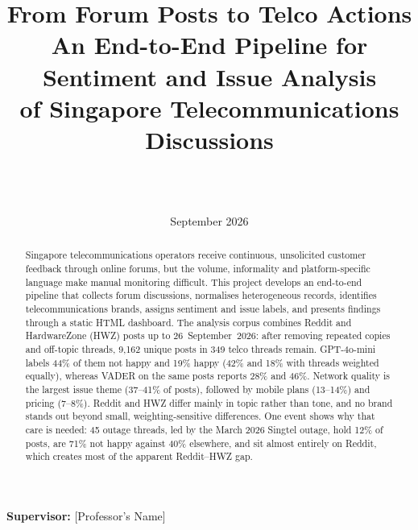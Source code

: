 \documentclass[11pt,a4paper]{article}
\title{\textbf{From Forum Posts to Telco Actions}\\
\large An End-to-End Pipeline for Sentiment and Issue Analysis\\
of Singapore Telecommunications Discussions}
\author{\studentname\\\studentid\\\programme}
\date{September 2026}
\newcommand{\supervisorname}{[Professor's Name]}
\begin{document}
\begin{center}
\end{center}

\maketitle

\begin{center}
\textbf{Supervisor:} \supervisorname
\end{center}

\vfill

\begin{abstract}
Singapore telecommunications operators receive continuous, unsolicited customer feedback through online forums, but the volume, informality and platform-specific language make manual monitoring difficult. This project develops an end-to-end pipeline that collects forum discussions, normalises heterogeneous records, identifies telecommunications brands, assigns sentiment and issue labels, and presents findings through a static HTML dashboard. The analysis corpus combines Reddit and HardwareZone (HWZ) posts up to 26~September~2026: after removing repeated copies and off-topic threads, 9,162 unique posts in 349 telco threads remain. GPT-4o-mini labels 44\% of them not happy and 19\% happy (42\% and 18\% with threads weighted equally), whereas VADER on the same posts reports 28\% and 46\%. Network quality is the largest issue theme (37--41\% of posts), followed by mobile plans (13--14\%) and pricing (7--8\%). Reddit and HWZ differ mainly in topic rather than tone, and no brand stands out beyond small, weighting-sensitive differences. One event shows why that care is needed: 45 outage threads, led by the March 2026 Singtel outage, hold 12\% of posts, are 71\% not happy against 40\% elsewhere, and sit almost entirely on Reddit, which creates most of the apparent Reddit--HWZ gap.


\end{abstract}
\end{document}
